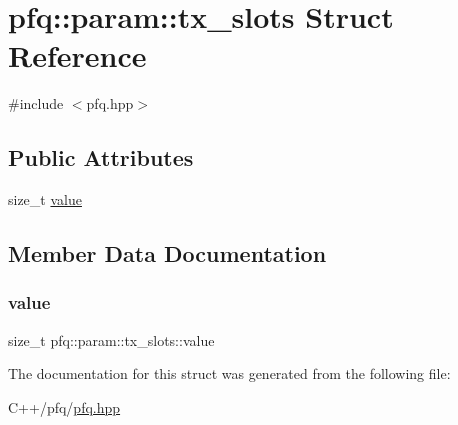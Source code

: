 \hypertarget{structpfq_1_1param_1_1tx__slots}{}\section{pfq\+:\+:param\+:\+:tx\+\_\+slots Struct Reference}
\label{structpfq_1_1param_1_1tx__slots}


{\ttfamily \#include $<$pfq.\+hpp$>$}

\subsection*{Public Attributes}
\begin{DoxyCompactItemize}
\item 
size\+\_\+t \hyperlink{structpfq_1_1param_1_1tx__slots_a0211960e3e5bfab53d2ed6bb96445723}{value}
\end{DoxyCompactItemize}


\subsection{Member Data Documentation}
\mbox{\label{structpfq_1_1param_1_1tx__slots_a0211960e3e5bfab53d2ed6bb96445723}} 
\subsubsection{\texorpdfstring{value}{value}}
{\footnotesize\ttfamily size\+\_\+t pfq\+::param\+::tx\+\_\+slots\+::value}



The documentation for this struct was generated from the following file\+:\begin{DoxyCompactItemize}
\item 
C++/pfq/\hyperlink{pfq_8hpp}{pfq.\+hpp}\end{DoxyCompactItemize}
